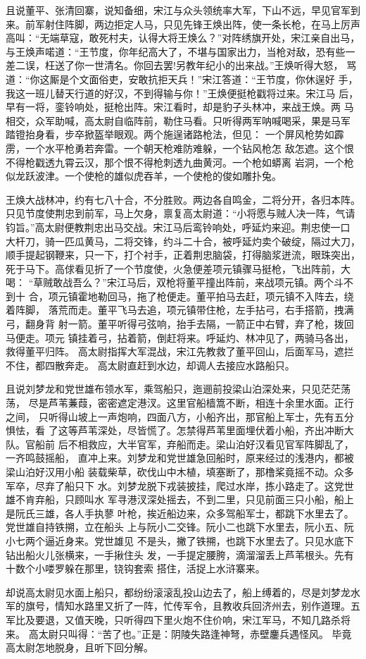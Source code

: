 且说董平、张清回寨，说知备细，宋江与众头领统率大军，下山不远，早见官军到
来。前军射住阵脚，两边拒定人马，只见先锋王焕出阵，使一条长枪，在马上厉声
高叫：“无端草寇，敢死村夫，认得大将王焕么？”对阵绣旗开处，宋江亲自出马，
与王焕声喏道：“王节度，你年纪高大了，不堪与国家出力，当枪对敌，恐有些一
差二误，枉送了你一世清名。你回去罢!另教年纪小的出来战。”王焕听得大怒，
骂道：“你这厮是个文面俗吏，安敢抗拒天兵！”宋江答道：“王节度，你休逞好
手，我这一班儿替天行道的好汉，不到得输与你！”王焕便挺枪戳将过来。宋江马
后，早有一将，銮铃响处，挺枪出阵。宋江看时，却是豹子头林冲，来战王焕。两
马相交，众军助喊，高太尉自临阵前，勒住马看。只听得两军呐喊喝采，果是马军
踏镫抬身看，步卒掀盔举眼观。两个施逞诸路枪法，但见：
一个屏风枪势如霹雳，一个水平枪勇若奔雷。一个朝天枪难防难躲，一个钻风枪怎
敌怎遮。这个恨不得枪戳透九霄云汉，那个恨不得枪刺透九曲黄河。一个枪如蟒离
岩洞，一个枪似龙跃波津。一个使枪的雄似虎吞羊，一个使枪的俊如雕扑兔。

王焕大战林冲，约有七八十合，不分胜败。两边各自鸣金，二将分开，各归本阵。
只见节度使荆忠到前军，马上欠身，禀复高太尉道：“小将愿与贼人决一阵，气请
钧旨。”高太尉便教荆忠出马交战。宋江马后鸾铃响处，呼延灼来迎。荆忠使一口
大杆刀，骑一匹瓜黄马，二将交锋，约斗二十合，被呼延灼卖个破绽，隔过大刀，
顺手提起钢鞭来，只一下，打个衬手，正着荆忠脑袋，打得脑浆迸流，眼珠突出，
死于马下。高俅看见折了一个节度使，火急便差项元镇骤马挺枪，飞出阵前，大喝：
“草贼敢战吾么？”宋江马后，双枪将董平撞出阵前，来战项元镇。两个斗不到十
合，项元镇霍地勒回马，拖了枪便走。董平拍马去赶，项元镇不入阵去，绕着阵脚，
落荒而走。董平飞马去追，项元镇带住枪，左手拈弓，右手搭箭，拽满弓，翻身背
射一箭。董平听得弓弦响，抬手去隔，一箭正中右臂，弃了枪，拨回马便走。项元
镇挂着弓，拈着箭，倒赶将来。呼延灼、林冲见了，两骑马各出，救得董平归阵。
高太尉指挥大军混战，宋江先教救了董平回山，后面军马，遮拦不住，都四散奔走。
高太尉直赶到水边，却调人去接应水路船只。

且说刘梦龙和党世雄布领水军，乘驾船只，迤逦前投梁山泊深处来，只见茫茫荡荡，
尽是芦苇蒹葭，密密遮定港汊。这里官船樯篙不断，相连十余里水面。正行之间，
只听得山坡上一声炮响，四面八方，小船齐出，那官船上军士，先有五分惧怯，看
了这等芦苇深处，尽皆慌了。怎禁得芦苇里面埋伏着小船，齐出冲断大队。官船前
后不相救应，大半官军，弃船而走。梁山泊好汉看见官军阵脚乱了，一齐鸣鼓摇船，
直冲上来。刘梦龙和党世雄急回船时，原来经过的浅港内，都被梁山泊好汉用小船
装载柴草，砍伐山中木植，填塞断了，那橹桨竟摇不动。众多军卒，尽弃了船只下
水。刘梦龙脱下戎装披挂，爬过水岸，拣小路走了。这党世雄不肯弃船，只顾叫水
军寻港汊深处摇去，不到二里，只见前面三只小船，船上是阮氏三雄，各人手执蓼
叶枪，挨近船边来，众多驾船军士，都跳下水里去了。党世雄自持铁搠，立在船头
上与阮小二交锋。阮小二也跳下水里去，阮小五、阮小七两个逼近身来。党世雄见
不是头，撇了铁搠，也跳下水里去了。只见水底下钻出船火儿张横来，一手揪住头
发，一手提定腰胯，滴溜溜丢上芦苇根头。先有十数个小喽罗躲在那里，铙钩套索
搭住，活捉上水浒寨来。

却说高太尉见水面上船只，都纷纷滚滚乱投山边去了，船上缚着的，尽是刘梦龙水
军的旗号，情知水路里又折了一阵，忙传军令，且教收兵回济州去，别作道理。五
军比及要退，又值天晚，只听得四下里火炮不住价响，宋江军马，不知几路杀将来。
高太尉只叫得：“苦了也。”正是：阴陵失路逢神弩，赤壁鏖兵遇怪风。
毕竟高太尉怎地脱身，且听下回分解。